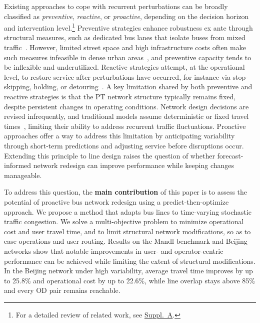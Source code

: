 \documentclass[11pt,a4paper]{article} %
\DeclareRobustCommand{\suppref}[1]{\href{https://github.com/zihao-guo/P2-5_CASPT_paper/blob/main/suppl/suppl.pdf}{Suppl.~#1}}
\begin{document}
Existing approaches to cope with recurrent perturbations can be broadly classified as \emph{preventive}, \emph{reactive}, or \emph{proactive}, depending on the decision horizon and intervention level.\footnote{For a detailed review of related work, see \suppref{A}.}
Preventive strategies enhance robustness ex ante through structural measures, such as dedicated bus lanes that isolate buses from mixed traffic~\citep{russo2022dedicated}. However, limited street space and high infrastructure costs often make such measures infeasible in dense urban areas~\citep{li2009evaluation}, and preventive capacity tends to be inflexible and underutilized.
 Reactive strategies attempt, at the operational level, to restore service after perturbations have occurred, for instance via stop-skipping, holding, or detouring~\citep{peled2021quality,tang2018optimal}.
A key limitation shared by both preventive and reactive strategies is that the PT network structure typically remains fixed, despite persistent changes in operating conditions. Network design decisions are revised infrequently, and traditional models assume deterministic or fixed travel times~\citep{Fonseca2020,buchel2020review}, limiting their ability to address recurrent traffic fluctuations. Proactive approaches offer a way to address this limitation by anticipating variability through short-term predictions and adjusting service before disruptions occur. Extending this principle to line design raises the question of whether forecast-informed network redesign can improve performance while keeping changes manageable.


To address this question, the \textbf{main contribution} of this paper is to assess the potential of proactive bus network redesign using a predict-then-optimize approach. We propose a method that adapts bus lines to time-varying stochastic traffic congestion. We solve a multi-objective problem to minimize operational cost and user travel time, and to limit structural network modifications, so as to ease operations and user routing.
Results on the Mandl benchmark and Beijing networks show that notable improvements in user- and operator-centric performance can be achieved while limiting the extent of structural modifications. 
%
In the Beijing network under high variability, average travel time improves by up to 25.8\% and operational cost by up to 22.6\%, while line overlap stays above 85\% and every OD pair remains reachable.
\end{document}

